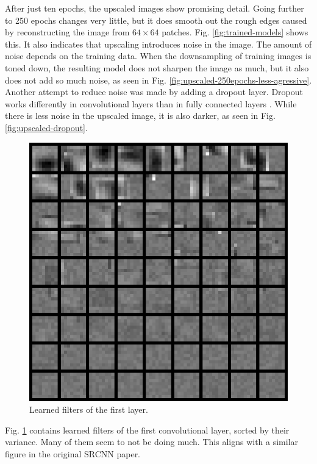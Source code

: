\documentclass[english]{mvi-report}
\begin{document}
\newpage
\noindent
After just ten epochs, the upscaled images show promising detail. Going further to 250 epochs changes very little, but it does smooth out the rough edges caused by reconstructing the image from $64\times64$ patches. Fig. \ref{fig:trained-models} shows this. It also indicates that upscaling introduces noise in the image. The amount of noise depends on the training data. When the downsampling of training images is toned down, the resulting model does not sharpen the image as much, but it also does not add so much noise, as seen in Fig. \ref{fig:upscaled-250epochs-less-agressive}. Another attempt to reduce noise was made by adding a dropout layer. Dropout works differently in convolutional layers than in fully connected layers \cite{Reinhold2019}. While there is less noise in the upscaled image, it is also darker, as seen in Fig. \ref{fig:upscaled-dropout}.

\begin{figure}[htpb]
  \centering
  \includegraphics[width=0.95\linewidth]{media/250epochs-learned-filters.png}
  \caption{Learned filters of the first layer.}
  \label{fig:learned-filters}
\end{figure}

Fig. \ref{fig:learned-filters} contains learned filters of the first convolutional layer, sorted by their variance. Many of them seem to not be doing much. This aligns with a similar figure in the original SRCNN paper.
\end{document}
